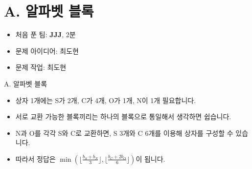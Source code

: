 \def\probno{A}
\def\probtitle{알파벳 블록}

\section{\probno{}. \probtitle{}}

\begin{frame} %
    \sectiontitle{\probno{}}{\probtitle{}}
    \begin{itemize}
        \item 처음 푼 팀: \textbf{JJJ}, 2분
        \item 문제 아이디어: 최도현
        \item 문제 작업: 최도현
    \end{itemize}
\end{frame}

\begin{frame}{\probno{}. \probtitle{}}
    \begin{itemize}
        \item 상자 1개에는 S가 2개, C가 4개, O가 1개, N이 1개 필요합니다.
        \item 서로 교환 가능한 블록끼리는 하나의 블록으로 통일해서 생각하면 쉽습니다.
        \item N과 O를 각각 S와 C로 교환하면, S 3개와 C 6개를 이용해 상자를 구성할 수 있습니다.
        \item 따라서 정답은 $\min(\lfloor \frac{b_S + b_N}{3} \rfloor, \lfloor \frac{b_C + 2b_O}{6} \rfloor)$이 됩니다.
    \end{itemize}
\end{frame}
